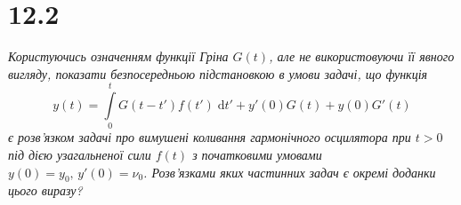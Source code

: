 


%


\section[Задача №12.2]{12.2}

\textit{Користуючись означенням функції Гріна $G(t)$, але не використовуючи її явного вигляду, показати безпосередньою підстановкою в умови задачі, що функція \[y(t) = \int\limits_0^t G(t - t') f(t') \;\mathrm{d}t' + y'(0) G(t) + y(0) G'(t)\] є розв’язком задачі про вимушені коливання гармонічного осцилятора при $t>0$ під дією узагальненої сили $f(t)$ з початковими умовами $y(0)=y_0, \, y'(0)=\nu_0$. Розв’язками яких частинних задач є окремі доданки цього виразу?}


%